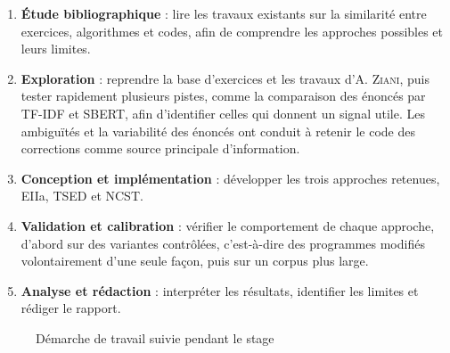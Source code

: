 \documentclass[12pt,a4paper,oneside]{report}
\begin{document}
\begin{enumerate}
    \item \textbf{Étude bibliographique} : lire les travaux existants sur
    la similarité entre exercices, algorithmes et codes, afin de
    comprendre les approches possibles et leurs limites.
    \item \textbf{Exploration} : reprendre la base d'exercices et les
    travaux d'A. \textsc{Ziani}, puis tester rapidement plusieurs pistes,
    comme la comparaison des énoncés par TF-IDF et SBERT, afin d'identifier
    celles qui donnent un signal utile. Les ambiguïtés et la variabilité des
    énoncés ont conduit à retenir le code des corrections comme source
    principale d'information.
    \item \textbf{Conception et implémentation} : développer les trois
    approches retenues, EIIa, TSED et NCST.
    \item \textbf{Validation et calibration} : vérifier le comportement de
    chaque approche, d'abord sur des variantes contrôlées, c'est-à-dire des
    programmes modifiés volontairement d'une seule façon, puis sur un
    corpus plus large.
    \item \textbf{Analyse et rédaction} : interpréter les résultats,
    identifier les limites et rédiger le rapport.
\end{enumerate}

\begin{figure}[H]
    \centering
    \caption{Démarche de travail suivie pendant le stage}
    \label{fig:methodo}
\end{figure}
\end{document}

